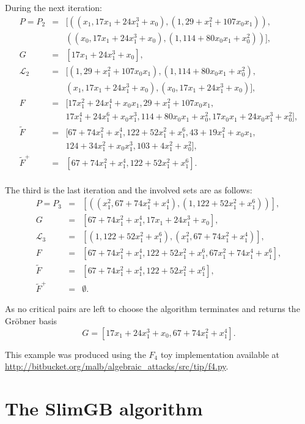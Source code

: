 During the next iteration:
\begin{align*}
P = P_2 &=& [((x_1, 17x_1 + 24x_1^3 + x_0), (1,29 + x_1^2 + 107x_0x_1)), \\
& & ((x_0, 17x_1 + 24x_1^3 + x_0), (1,114 + 80x_0x_1 + x_0^2))],\\
G  &=& [17x_1 + 24x_1^3 + x_0],\\
\mathcal{L}_2 &=& [(1, 29 + x_1^2 + 107x_0x_1), (1, 114 + 80x_0x_1 + x_0^2), \\
& &(x_1, 17x_1 + 24x_1^3 + x_0), (x_0, 17x_1 + 24x_1^3 + x_0)],\\
 F &=& [17x_1^2 + 24x_1^4 + x_0x_1, 29 + x_1^2 + 107x_0x_1, \\
& &17x_1^4 + 24x_1^6 + x_0x_1^3, 114 + 80x_0x_1 + x_0^2, 17x_0x_1 + 24x_0x_1^3 + x_0^2],\\
 \tilde{F} &=& [67 + 74x_1^2 + x_1^4, 122 + 52x_1^2 + x_1^6, 43 + 19x_1^2 + x_0x_1, \\
& &124 + 34x_1^2 + x_0x_1^3, 103 + 4x_1^2 + x_0^2],\\
 \tilde{F}^+ &=& [67 + 74x_1^2 + x_1^4, 122 + 52x_1^2 + x_1^6].\\
\end{align*}

The third is the last iteration and the involved sets are as follows:
\begin{align*}
P = P_3 &=& [((x_1^2, 67 + 74x_1^2 + x_1^4), (1,122 + 52x_1^2 + x_1^6))],\\
G &=& [67 + 74x_1^2 + x_1^4, 17x_1 + 24x_1^3 + x_0],\\
\mathcal{L}_3 &=& [(1, 122 + 52x_1^2 + x_1^6), (x_1^2, 67 + 74x_1^2 + x_1^4)],\\
F &=& [67 + 74x_1^2 + x_1^4, 122 + 52x_1^2 + x_1^6, 67x_1^2 + 74x_1^4 + x_1^6],\\
\tilde{F} &=& [67 + 74x_1^2 + x_1^4, 122 + 52x_1^2 + x_1^6],\\
\tilde{F}^+ &=& \emptyset.
\end{align*}

As no critical pairs are left to choose the algorithm terminates and returns the Gröbner basis
\[ G = [17x_1 + 24x_1^3 + x_0, 67 + 74x_1^2 + x_1^4]. \]

This example was produced using the $F_4$ toy implementation available at
\url{http://bitbucket.org/malb/algebraic_attacks/src/tip/f4.py}.

\section*{The SlimGB algorithm}

